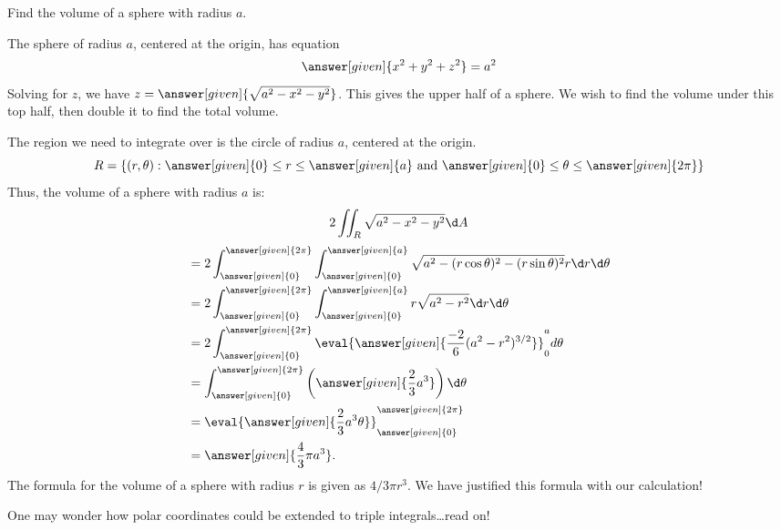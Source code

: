 \documentclass{ximera}
\begin{document}
\begin{example}
  Find the volume of a sphere with radius $a$.
  \begin{explanation}
    The sphere of radius $a$, centered at the origin, has equation
    \[
    \answer[given]{x^2+y^2+z^2}=a^2
    \]
    Solving for $z$, we have
    $z=\answer[given]{\sqrt{a^2-x^2-y^2}}$. This gives the upper half
    of a sphere. We wish to find the volume under this top half, then
    double it to find the total volume.

    The region we need to integrate over is the circle of radius $a$,
    centered at the origin.
    \[
    R =\{(r,\theta):\text{$\answer[given]{0}\leq r\leq \answer[given]{a}$ and  $\answer[given]{0}\leq\theta\leq\answer[given]{2\pi}$}\}
    \]
    Thus, the volume of a sphere with radius $a$ is:
    \[
    2\iint_R\sqrt{a^2-x^2-y^2}\d A
    \]
    \begin{align*}
      &= 2\int_{\answer[given]{0}}^{\answer[given]{2\pi}}\int_{\answer[given]{0}}^{\answer[given]{a}}\sqrt{a^2-(r\cos\theta)^2-(r\sin\theta)^2}r\d r\d\theta\\
      &=2\int_{\answer[given]{0}}^{\answer[given]{2\pi}}\int_{\answer[given]{0}}^{\answer[given]{a}}r\sqrt{a^2-r^2}\d r\d\theta\\
      &=2\int_{\answer[given]{0}}^{\answer[given]{2\pi}}\eval{\answer[given]{\frac{-2}{6}(a^2-r^2)^{3/2}}}_{0}^a d\theta\\
      &= \int_{\answer[given]{0}}^{\answer[given]{2\pi}}\left(\answer[given]{\frac{2}{3}a^3}\right)\d \theta\\
      &=\eval{\answer[given]{\frac{2}{3}a^3\theta}}_{\answer[given]{0}}^{\answer[given]{2\pi}}\\
      &=\answer[given]{\frac{4}{3}\pi a^3}.
    \end{align*}
    The formula for the volume of a sphere with radius $r$ is given as
    $4/3\pi r^3$.  We have justified this formula with our
    calculation!
  \end{explanation}
\end{example}

One may wonder how polar coordinates could be extended to triple integrals\dots read on!
\end{document}
